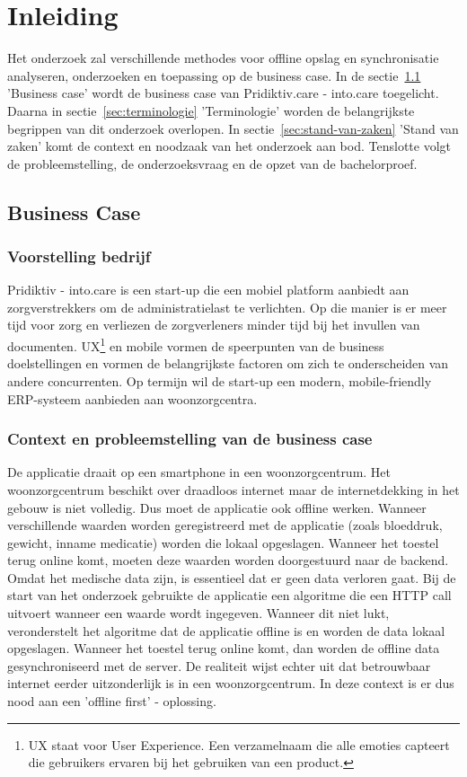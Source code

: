 \chapter{Inleiding}
\label{ch:inleiding}
Het onderzoek zal verschillende methodes voor offline opslag en synchronisatie analyseren, onderzoeken en toepassing op de business case. In de sectie~\ref{sec:business-case} 'Business case' wordt de business case van Pridiktiv.care - into.care toegelicht. Daarna in sectie~\ref{sec:terminologie} 'Terminologie' worden de belangrijkste begrippen van dit onderzoek overlopen. In sectie~\ref{sec:stand-van-zaken} 'Stand van zaken' komt de context en noodzaak van het onderzoek aan bod. Tenslotte volgt de probleemstelling, de onderzoeksvraag en de opzet van de bachelorproef.
\section{Business Case}
\label{sec:business-case}
\subsection{Voorstelling bedrijf}
Pridiktiv - into.care is een start-up die een mobiel platform aanbiedt aan zorgverstrekkers om de administratielast te verlichten. Op die manier is er meer tijd voor zorg en verliezen de zorgverleners minder tijd bij het invullen van documenten. UX\footnote{UX staat voor User Experience. Een verzamelnaam die alle emoties capteert die gebruikers ervaren bij het gebruiken van een product.} en mobile vormen de speerpunten van de business doelstellingen en vormen de belangrijkste factoren om zich te onderscheiden van andere concurrenten. Op termijn wil de start-up een modern, mobile-friendly ERP-systeem aanbieden aan woonzorgcentra.
\clearpage
\subsection{Context en probleemstelling van de business case}
De applicatie draait op een smartphone in een woonzorgcentrum. Het woonzorgcentrum beschikt over draadloos internet maar de internetdekking in het gebouw is niet volledig. Dus moet de applicatie ook offline werken. Wanneer verschillende waarden worden geregistreerd met de applicatie (zoals bloeddruk, gewicht, inname medicatie) worden die lokaal opgeslagen. Wanneer het toestel terug online komt, moeten deze waarden worden doorgestuurd naar de backend. Omdat het medische data zijn, is essentieel dat er geen data verloren gaat. Bij de start van het onderzoek gebruikte de applicatie een algoritme die een HTTP call uitvoert wanneer een waarde wordt ingegeven. Wanneer dit niet lukt, veronderstelt het algoritme dat de applicatie offline is en worden de data lokaal opgeslagen. Wanneer het toestel terug online komt, dan worden de offline data gesynchroniseerd met de server. De realiteit wijst echter uit dat betrouwbaar internet eerder uitzonderlijk is in een woonzorgcentrum. In deze context is er dus nood aan een 'offline first' -  oplossing.

